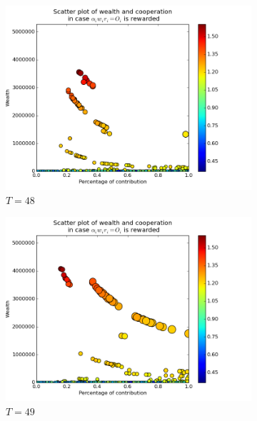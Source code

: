 \documentclass{article}
\begin{document}
\begin{figure}[h]
\begin{subfigure}[t]{0.333\textwidth}
\centering
\includegraphics[width=\textwidth]{nq_output_scatter/scatter_ranking_1_048.png}
\caption{$T = 48$}
\end{subfigure}%
%
\hfill
%
\begin{subfigure}[t]{0.333\textwidth}
\centering
\includegraphics[width=\textwidth]{nq_output_scatter/scatter_ranking_1_049.png}
\caption{$T = 49$}
\end{subfigure}%
%
\hfill
%
\begin{subfigure}[t]{0.333\textwidth}
\centering

\end{subfigure}
\end{figure}
\end{document}

